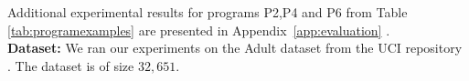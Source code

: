 Additional experimental results for programs P2,P4 and P6 from Table \ref{tab:programexamples} are presented in Appendix~\ref{app:evaluation} .%
\\\textbf{Dataset:}
We ran our experiments on the Adult dataset from the UCI repository \cite{UCI}. The dataset is of size $32,651$.
